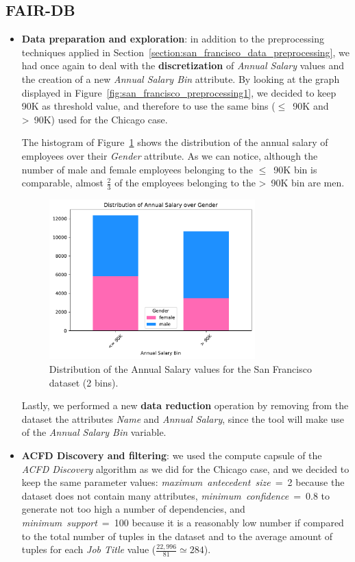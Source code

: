 \subsection{FAIR-DB}
\begin{itemize}
\item \textbf{Data preparation and exploration}: in addition to the preprocessing techniques applied in Section~\ref{section:san_francisco_data_preprocessing}, we had once again to deal with the \textbf{discretization} of \textit{Annual Salary} values and the creation of a new \textit{Annual Salary Bin} attribute. By looking at the graph displayed in Figure~\ref{fig:san_francisco_preprocessing1}, we decided to keep 90K as threshold value, and therefore to use the same bins (\(\leq\)~90K and >~90K) used for the Chicago case.

The histogram of Figure~\ref{fig:san_francisco_fair-db1} shows the distribution of the annual salary of employees over their \textit{Gender} attribute. As we can notice, although the number of male and female employees belonging to the \(\leq\)~90K bin is comparable, almost \(\frac{2}{3}\) of the employees belonging to the >~90K bin are men.

\begin{figure}[t!]
\centering
\includegraphics[width=0.75\textwidth]{figures/san_francisco_2bins_annual_salary_over_gender.pdf}
\caption{Distribution of the \textrm{Annual Salary} values for the San Francisco dataset (2 bins).}
\label{fig:san_francisco_fair-db1}
\end{figure}

Lastly, we performed a new \textbf{data reduction} operation by removing from the dataset the attributes \textit{Name} and \textit{Annual Salary}, since the tool will make use of the \textit{Annual Salary Bin} variable.
\item \textbf{ACFD Discovery and filtering}: we used the compute capsule of the \textit{ACFD Discovery} algorithm as we did for the Chicago case, and we decided to keep the same parameter values: \textit{maximum~antecedent~size}~=~2 because the dataset does not contain many attributes, \textit{minimum~confidence}~=~0.8 to generate not too high a number of dependencies, and \textit{minimum~support}~=~100 because it is a reasonably low number if compared to the total number of tuples in the dataset and to the average amount of tuples for each \textit{Job Title} value (\(\frac{22,996}{81} \simeq 284\)).


\end{itemize}
